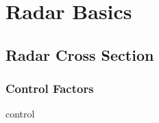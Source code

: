 % 

\section{Radar Basics}

\subsection{Radar Cross Section}
%
\begin{frame}\frametitle{Control Factors}
\begin{overpic}[ scale = 0.325 ]
		{\pLocalGraphics control}
	\end{overpic}
	\ \\
	\cite{cite-trcs}
\end{frame}
%

\endinput  %
